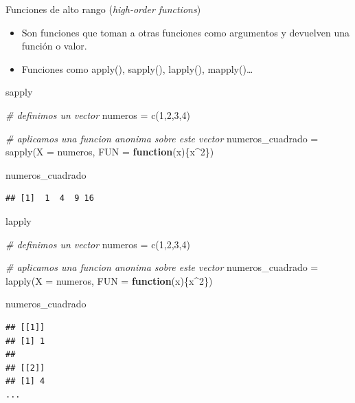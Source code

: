 \documentclass[
  ignorenonframetext,
]{beamer}
\newenvironment{Shaded}{\begin{snugshade}}{\end{snugshade}}
\newcommand{\AttributeTok}[1]{\textcolor[rgb]{0.77,0.63,0.00}{#1}}
\newcommand{\CommentTok}[1]{\textcolor[rgb]{0.56,0.35,0.01}{\textit{#1}}}
\newcommand{\ControlFlowTok}[1]{\textcolor[rgb]{0.13,0.29,0.53}{\textbf{#1}}}
\newcommand{\DecValTok}[1]{\textcolor[rgb]{0.00,0.00,0.81}{#1}}
\newcommand{\FunctionTok}[1]{\textcolor[rgb]{0.00,0.00,0.00}{#1}}
\newcommand{\NormalTok}[1]{#1}
\newcommand{\OtherTok}[1]{\textcolor[rgb]{0.56,0.35,0.01}{#1}}
\newcommand{\SpecialCharTok}[1]{\textcolor[rgb]{0.00,0.00,0.00}{#1}}
\providecommand{\tightlist}{%
  \setlength{\itemsep}{0pt}\setlength{\parskip}{0pt}}
\begin{document}
\begin{frame}{Funciones de alto rango (\emph{high-order functions})}
\protect\hypertarget{funciones-de-alto-rango-high-order-functions}{}
\begin{itemize}
\tightlist
\item
  Son funciones que toman a otras funciones como argumentos y devuelven
  una función o valor.
\item
  Funciones como apply(), sapply(), lapply(), mapply()\ldots{}
\end{itemize}
\end{frame}

\begin{frame}[fragile]{sapply}
\protect\hypertarget{sapply}{}
\small

\begin{Shaded}
\begin{Highlighting}[]
\CommentTok{\# definimos un vector}
\NormalTok{numeros }\OtherTok{=} \FunctionTok{c}\NormalTok{(}\DecValTok{1}\NormalTok{,}\DecValTok{2}\NormalTok{,}\DecValTok{3}\NormalTok{,}\DecValTok{4}\NormalTok{)}

\CommentTok{\# aplicamos una funcion anonima sobre este vector}
\NormalTok{numeros\_cuadrado }\OtherTok{=} \FunctionTok{sapply}\NormalTok{(}\AttributeTok{X =}\NormalTok{ numeros, }\AttributeTok{FUN =} \ControlFlowTok{function}\NormalTok{(x)\{x}\SpecialCharTok{\^{}}\DecValTok{2}\NormalTok{\})}

\NormalTok{numeros\_cuadrado}
\end{Highlighting}
\end{Shaded}

\begin{verbatim}
## [1]  1  4  9 16
\end{verbatim}

\normalsize
\end{frame}

\begin{frame}[fragile]{lapply}
\protect\hypertarget{lapply}{}
\small

\begin{Shaded}
\begin{Highlighting}[]
\CommentTok{\# definimos un vector}
\NormalTok{numeros }\OtherTok{=} \FunctionTok{c}\NormalTok{(}\DecValTok{1}\NormalTok{,}\DecValTok{2}\NormalTok{,}\DecValTok{3}\NormalTok{,}\DecValTok{4}\NormalTok{)}

\CommentTok{\# aplicamos una funcion anonima sobre este vector}
\NormalTok{numeros\_cuadrado }\OtherTok{=} \FunctionTok{lapply}\NormalTok{(}\AttributeTok{X =}\NormalTok{ numeros, }\AttributeTok{FUN =} \ControlFlowTok{function}\NormalTok{(x)\{x}\SpecialCharTok{\^{}}\DecValTok{2}\NormalTok{\})}

\NormalTok{numeros\_cuadrado}
\end{Highlighting}
\end{Shaded}

\begin{verbatim}
## [[1]]
## [1] 1
## 
## [[2]]
## [1] 4
...
\end{verbatim}

\normalsize
\end{frame}
\end{document}

